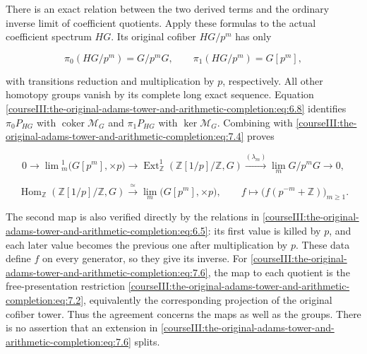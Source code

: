There is an exact relation between the two derived terms and the ordinary inverse limit of coefficient quotients. Apply these formulas to the actual coefficient spectrum \(HG\). Its original cofiber \(HG/p^m\) has only

\begin{equation}
\pi_0(HG/p^m)=G/p^mG,
\qquad \pi_1(HG/p^m)=G[p^m],
\label{courseIII:the-original-adams-tower-and-arithmetic-completion:eq:7.5}
\end{equation}

with transitions reduction and multiplication by \(p\), respectively. All other homotopy groups vanish by its complete long exact sequence. Equation \eqref{courseIII:the-original-adams-tower-and-arithmetic-completion:eq:6.8} identifies \(\pi_0P_{HG}\) with \(\operatorname{coker}\mathcal M_G\) and \(\pi_1P_{HG}\) with \(\ker\mathcal M_G\). Combining with \eqref{courseIII:the-original-adams-tower-and-arithmetic-completion:eq:7.4} proves

\begin{equation}
0\longrightarrow\lim{}^1_m\bigl(G[p^m],\times p\bigr)
\longrightarrow\operatorname{Ext}^1_{\mathbb Z}(\mathbb Z[1/p]/\mathbb Z,G)
\xrightarrow{(\lambda_m)}\lim_mG/p^mG\longrightarrow0,
\label{courseIII:the-original-adams-tower-and-arithmetic-completion:eq:7.6}
\end{equation}

\begin{equation}
\operatorname{Hom}_{\mathbb Z}(\mathbb Z[1/p]/\mathbb Z,G)
\xrightarrow{\ \simeq\ }\lim_m\bigl(G[p^m],\times p\bigr),
\qquad f\longmapsto\bigl(f(p^{-m}+\mathbb Z)\bigr)_{m\geq1}.
\label{courseIII:the-original-adams-tower-and-arithmetic-completion:eq:7.7}
\end{equation}

The second map is also verified directly by the relations in \eqref{courseIII:the-original-adams-tower-and-arithmetic-completion:eq:6.5}: its first value is killed by \(p\), and each later value becomes the previous one after multiplication by \(p\). These data define \(f\) on every generator, so they give its inverse. For \eqref{courseIII:the-original-adams-tower-and-arithmetic-completion:eq:7.6}, the map to each quotient is the free-presentation restriction \eqref{courseIII:the-original-adams-tower-and-arithmetic-completion:eq:7.2}, equivalently the corresponding projection of the original cofiber tower. Thus the agreement concerns the maps as well as the groups. There is no assertion that an extension in \eqref{courseIII:the-original-adams-tower-and-arithmetic-completion:eq:7.6} splits.

